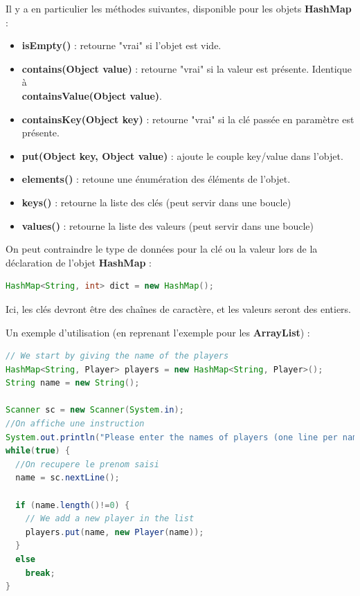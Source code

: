 \documentclass[a4paper,twoside]{article}
\begin{document}
Il y a en particulier les méthodes suivantes, disponible pour les objets \textbf{HashMap} :
\begin{itemize}
\item \textbf{isEmpty()} : retourne "vrai" si l'objet est vide.
\item \textbf{contains(Object value)} : retourne "vrai" si la valeur est présente. Identique à\\ \textbf{containsValue(Object value)}.
\item \textbf{containsKey(Object key)} : retourne "vrai" si la clé passée en paramètre est présente.
\item \textbf{put(Object key, Object value)} : ajoute le couple key/value dans l'objet.
\item \textbf{elements()} : retoune une énumération des éléments de l'objet.
\item \textbf{keys()} : retourne la liste des clés (peut servir dans une boucle)
\item \textbf{values()} : retourne la liste des valeurs (peut servir dans une boucle)
\end{itemize}

\begin{remarque}
On peut contraindre le type de données pour la clé ou la valeur lors de la déclaration de l'objet \textbf{HashMap} :
\begin{lstlisting}[language=java]
HashMap<String, int> dict = new HashMap();
\end{lstlisting}
Ici, les clés devront être des chaînes de caractère, et les valeurs seront des entiers.
\end{remarque}


Un exemple d'utilisation (en reprenant l'exemple pour les \textbf{ArrayList}) :
\begin{lstlisting}[language=java]
// We start by giving the name of the players
HashMap<String, Player> players = new HashMap<String, Player>();
String name = new String();

Scanner sc = new Scanner(System.in);
//On affiche une instruction
System.out.println("Please enter the names of players (one line per name, leave a blank line to end the process) :");
while(true) {
  //On recupere le prenom saisi
  name = sc.nextLine();
  
  if (name.length()!=0) {
    // We add a new player in the list
    players.put(name, new Player(name));
  }
  else
    break;
}
\end{lstlisting}
\end{document}
